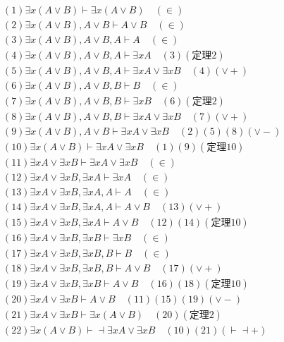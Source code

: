 \documentclass{article}
\begin{document}
\[
\begin{aligned}
&(1)\exists x (A \vee B) \vdash \exists x (A \vee B) \quad (\in) \\
&(2)\exists x (A \vee B), A \vee B \vdash A \vee B \quad (\in) \\
&(3)\exists x (A \vee B), A \vee B, A \vdash A \quad (\in) \\
&(4)\exists x (A \vee B), A \vee B, A \vdash \exists x A \quad (3)(\mbox{定理}2) \\
&(5)\exists x (A \vee B), A \vee B, A \vdash \exists x A \vee \exists x B \quad (4)(\vee +) \\
&(6)\exists x (A \vee B), A \vee B, B \vdash B \quad (\in) \\
&(7)\exists x (A \vee B), A \vee B, B \vdash \exists x B \quad (6)(\mbox{定理}2) \\
&(8)\exists x (A \vee B), A \vee B, B \vdash \exists x A \vee \exists x B \quad (7)(\vee +) \\
&(9)\exists x (A \vee B), A \vee B \vdash \exists x A \vee \exists x B \quad (2)(5)(8)(\vee -) \\
&(10)\exists x (A \vee B) \vdash \exists x A \vee \exists x B \quad (1)(9)(\mbox{定理}10) \\
&(11)\exists x A \vee \exists x B \vdash \exists x A \vee \exists x B \quad (\in) \\
&(12)\exists x A \vee \exists x B, \exists x A \vdash \exists x A \quad (\in) \\
&(13)\exists x A \vee \exists x B, \exists x A, A \vdash A \quad (\in) \\
&(14)\exists x A \vee \exists x B, \exists x A, A \vdash A \vee B \quad (13)(\vee +) \\
&(15)\exists x A \vee \exists x B, \exists x A \vdash A \vee B \quad (12)(14)(\mbox{定理}10)\\
&(16)\exists x A \vee \exists x B, \exists x B \vdash \exists x B \quad (\in) \\
&(17)\exists x A \vee \exists x B, \exists x B, B \vdash B \quad (\in) \\ 
&(18)\exists x A \vee \exists x B, \exists x B, B \vdash A \vee B \quad (17)(\vee +) \\
&(19)\exists x A \vee \exists x B, \exists x B \vdash A \vee B \quad (16)(18)(\mbox{定理}10)\\
&(20)\exists x A \vee \exists x B \vdash A \vee B \quad (11)(15)(19)(\vee -) \\
&(21)\exists x A \vee \exists x B \vdash \exists x (A \vee B) \quad (20)(\mbox{定理}2) \\
&(22)\exists x (A \vee B) \vdash \dashv \exists x A \vee \exists x B \quad (10)(21)(\vdash \dashv  +)
\end{aligned}    
\]
\end{document}
